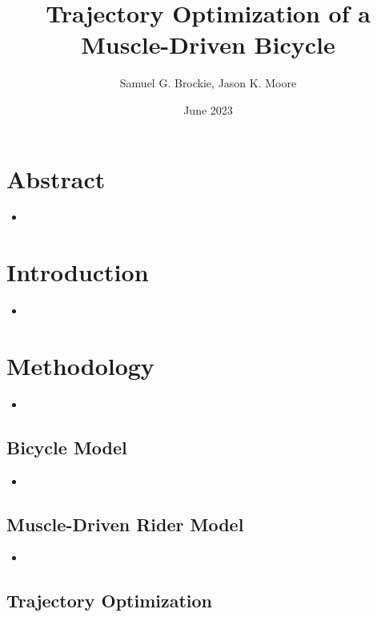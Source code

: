 \documentclass{article}
\title{Trajectory Optimization of a Muscle-Driven Bicycle}
\author{Samuel G. Brockie, Jason K. Moore}
\date{June 2023}
\begin{document}
\maketitle

\section{Abstract}

\begin{itemize}
    \item 
\end{itemize}

\section{Introduction} \label{sec:introduction}

\begin{itemize}
    \item {}
\end{itemize}

\section{Methodology}

\begin{itemize}
    \item 
\end{itemize}

\subsection{Bicycle Model}

\begin{itemize}
    \item 
\end{itemize}

\subsection{Muscle-Driven Rider Model}

\begin{itemize}
    \item 
\end{itemize}

\subsection{Trajectory Optimization}
\end{document}
